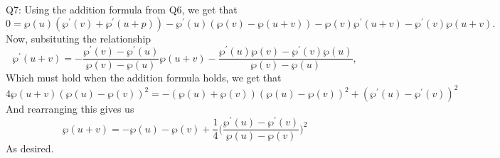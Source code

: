 \documentclass[letterpaper]{article}
\begin{document}
 \noindent  Q7: Using the addition formula from Q6, we get that $$0 = \wp(u)(\wp^\prime(v) + \wp^\prime(u+p)) - \wp^\prime(u)(\wp(v) - \wp(u+v))  - \wp(v)\wp^\prime(u+v) - \wp^\prime(v)\wp(u+v).$$
Now, subsituting the relationship $$\wp^\prime(u+v) = - \frac{\wp^\prime(v) - \wp^\prime(u)}{\wp(v) - \wp(u)} \wp(u+v) - \frac{\wp^\prime(u)\wp(v) - \wp^\prime(v)\wp(u)}{\wp(v) - \wp(u)},$$
Which must hold when the addition formula holds, we get that $$4 \wp(u+v)(\wp(u) - \wp(v))^2 =-(\wp(u) + \wp(v))(\wp(u) - \wp(v))^2 + (\wp^\prime(u)- \wp^\prime(v))^2 $$
And rearranging this gives us $$\wp(u+v) = -\wp(u) - \wp(v) + \frac{1}{4}\Big(\frac{\wp^\prime(u) - \wp^\prime(v)}{\wp(u) - \wp(v)} \Big)^2$$
As desired. 
\end{document}
